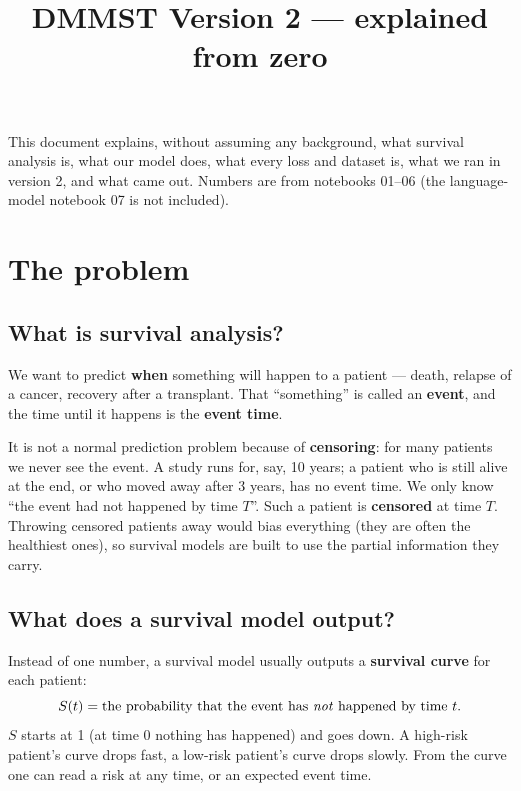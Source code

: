 \documentclass[11pt]{article}
\title{DMMST Version 2 --- explained from zero}
\author{}
\date{}
\begin{document}
\maketitle

\noindent This document explains, without assuming any background, what survival analysis is, what
our model does, what every loss and dataset is, what we ran in version 2, and what came out. Numbers
are from notebooks 01--06 (the language-model notebook 07 is not included).

\tableofcontents
\newpage

\section{The problem}

\subsection{What is survival analysis?}
We want to predict \textbf{when} something will happen to a patient --- death, relapse of a cancer,
recovery after a transplant. That ``something'' is called an \textbf{event}, and the time until it
happens is the \textbf{event time}.

It is not a normal prediction problem because of \textbf{censoring}: for many patients we never see
the event. A study runs for, say, 10 years; a patient who is still alive at the end, or who moved away
after 3 years, has no event time. We only know ``the event had not happened by time $T$''. Such a
patient is \textbf{censored} at time $T$. Throwing censored patients away would bias everything (they
are often the healthiest ones), so survival models are built to use the partial information they carry.

\subsection{What does a survival model output?}
Instead of one number, a survival model usually outputs a \textbf{survival curve} for each patient:
\[
  S(t) = \text{the probability that the event has \emph{not} happened by time } t.
\]
$S$ starts at 1 (at time 0 nothing has happened) and goes down. A high-risk patient's curve drops
fast, a low-risk patient's curve drops slowly. From the curve one can read a risk at any time, or an
expected event time.
\end{document}
